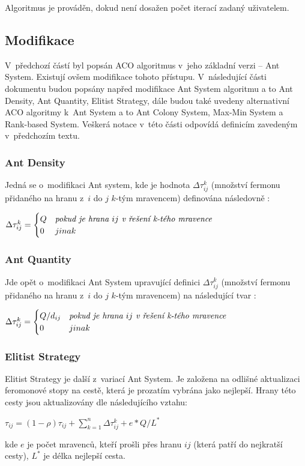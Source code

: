 \documentclass[a4paper, 12pt]{article}
\begin{document}
Algoritmus je prováděn, dokud není dosažen počet iterací zadaný uživatelem.

\subsection{Modifikace}
\label{subsec:modif}
V~předchozí částí byl popsán ACO algoritmus v~jeho základní verzi -- Ant System. Existují ovšem modifikace tohoto přístupu.
V~následující části dokumentu budou popsány napřed modifikace Ant System algoritmu a to Ant Density, Ant Quantity, Elitist Strategy, dále budou
také uvedeny alternativní ACO algoritmy k~Ant System a to Ant Colony System, Max-Min System a Rank-based System. Veškerá notace v~této části odpovídá
definicím zavedeným v~předchozím textu.

\subsubsection{Ant Density}
Jedná se o~modifikaci Ant system, kde je hodnota $\Delta\tau_{ij}^k$ (množství fermonu přidaného na hranu z~$i$ do $j$ $k$-tým mravencem) definována
následovně \cite{aco:variations}:
\begin{center}
  $\Delta\tau_{ij}^k = 
  \begin{cases}
    Q & \emph{pokud je hrana } ij \emph{ v~řešení k-tého mravence}\\
    0 & jinak
   \end{cases}
   $
\end{center}

\subsubsection{Ant Quantity}
Jde opět o~modifikaci Ant System upravující definici $\Delta\tau_{ij}^k$ (množství fermonu přidaného na hranu z~$i$ do $j$ $k$-tým mravencem) na následující
tvar \cite{aco:variations}:
\begin{center}
  $\Delta\tau_{ij}^k = 
  \begin{cases}
    Q/d_{ij} & \emph{pokud je hrana } ij \emph{ v~řešení k-tého mravence}\\
    0 & jinak
   \end{cases}
   $
\end{center}

\subsubsection{Elitist Strategy}
Elitist Strategy je další z~variací Ant System. Je založena na odlišné aktualizaci feromonové stopy na cestě, která je prozatím vybrána jako nejlepší.
Hrany této cesty jsou aktualizovány dle následujícího vztahu\cite{aco:variations}:
\begin{center}
  $\tau_{ij}=(1-\rho)\tau_{ij}+\sum\limits_{k=1}^{n}\Delta\tau_{ij}^k + e*Q/L^*$
\end{center}
kde $e$ je počet mravenců, kteří prošli přes hranu $ij$ (která patří do nejkratší cesty), $L^{*}$ je délka nejlepší cesta.
\end{document}
